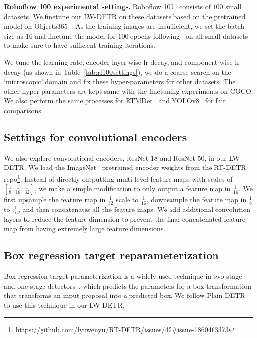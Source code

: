 \documentclass[runningheads]{llncs}
\begin{document}
\noindent\textbf{Roboflow 100 experimental settings.} Roboflow 100~\cite{ciaglia2022roboflow} consists of $100$ small datasets. We finetune our LW-DETR on these datasets based on the pretrained model on Objects365~\cite{shao2019objects365}. As the training images are insufficient, we set the batch size as $16$ and finetune the model for $100$ epochs following~\cite{ciaglia2022roboflow} on all small datasets to make sure to have sufficient training iterations. 

We tune the learning rate, encoder layer-wise lr decay, and component-wise lr decay (as shown in Table~\ref{tab:rf100settings}), we do a coarse search on the `microscopic' domain and fix these hyper-parameters for other datasets. The other hyper-parameters are kept same with the finetuning experiments on COCO. We also perform the same processes for RTMDet~\cite{lyu2022rtmdet} and YOLOv8~\cite{yolov8_ultralytics} for fair comparisons.

\subsection{Settings for convolutional encoders} 
We also explore convolutional encoders, ResNet-18 and ResNet-50, in our LW-DETR. We load the ImageNet~\cite{deng2009imagenet} pretrained encoder weights from the RT-DETR repo\footnote{\tiny\url{https://github.com/lyuwenyu/RT-DETR/issues/42\#issue-1860463373}}. Instead of directly outputting multi-level feature maps with scales of $[\frac{1}{8}, \frac{1}{16}, \frac{1}{32}]$, we make a simple modification to only output a feature map in $\frac{1}{16}$. We first upsample the feature map in $\frac{1}{32}$ scale to $\frac{1}{16}$, downsample the feature map in $\frac{1}{8}$ to $\frac{1}{16}$, and then concatenates all the feature maps. We add additional convolution layers to reduce the feature dimension to prevent the final concatenated feature map from having extremely large feature dimensions.

\subsection{Box regression target reparameterization}
Box regression target parameterization is a widely used technique in two-stage and one-stage detectors~\cite{ren2015faster,lin2017focal,bochkovskiy2020yolov4,yolov5}, which predicts the parameters for a box transformation that transforms an input proposal into a predicted box. We follow Plain DETR~\cite{lin2023detr} to use this technique in our LW-DETR.
\end{document}
